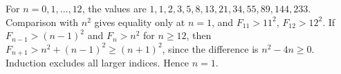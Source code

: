 For $n=0,1,\ldots,12$, the values are $1,1,2,3,5,8,13,21,34,55,89,144,233$. Comparison with $n^2$ gives equality only at $n=1$, and $F_{11}>11^2$, $F_{12}>12^2$. If $F_{n-1}>(n-1)^2$ and $F_n>n^2$ for $n\ge12$, then $F_{n+1}>n^2+(n-1)^2\ge(n+1)^2$, since the difference is $n^2-4n\ge0$. Induction excludes all larger indices. Hence $\boxed{n=1}$.
